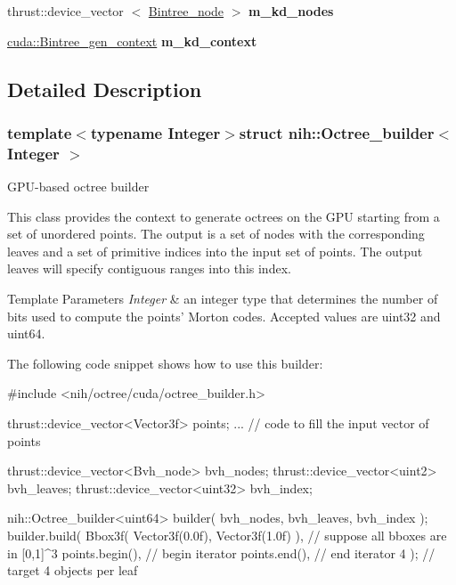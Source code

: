 \begin{DoxyCompactItemize}
\item 
\hypertarget{structnih_1_1_octree__builder_a3ef8a279ed45271b0bef0530932ae4c8}{
thrust\-::device\-\_\-vector\*
$<$ \hyperlink{structnih_1_1_bintree__node}{\-Bintree\-\_\-node} $>$ {\bfseries m\-\_\-kd\-\_\-nodes}}
\label{structnih_1_1_octree__builder_a3ef8a279ed45271b0bef0530932ae4c8}

\item 
\hypertarget{structnih_1_1_octree__builder_ac19a42cbf82d21e270512c0121c329c8}{
\hyperlink{structnih_1_1cuda_1_1_bintree__gen__context}{cuda\-::\-Bintree\-\_\-gen\-\_\-context} {\bfseries m\-\_\-kd\-\_\-context}}
\label{structnih_1_1_octree__builder_ac19a42cbf82d21e270512c0121c329c8}

\end{DoxyCompactItemize}


\subsection{\-Detailed \-Description}
\subsubsection*{template$<$typename Integer$>$struct nih\-::\-Octree\-\_\-builder$<$ Integer $>$}

\-G\-P\-U-\/based octree builder

\-This class provides the context to generate octrees on the \-G\-P\-U starting from a set of unordered points. \-The output is a set of nodes with the corresponding leaves and a set of primitive indices into the input set of points. \-The output leaves will specify contiguous ranges into this index.


\begin{DoxyTemplParams}{\-Template Parameters}
{\em \-Integer} & an integer type that determines the number of bits used to compute the points' \-Morton codes. \-Accepted values are uint32 and uint64.\\
\hline
\end{DoxyTemplParams}
\-The following code snippet shows how to use this builder\-:


\begin{DoxyCode}
 #include <nih/octree/cuda/octree_builder.h>

 thrust::device_vector<Vector3f> points;
 ... // code to fill the input vector of points

 thrust::device_vector<Bvh_node> bvh_nodes;
 thrust::device_vector<uint2>    bvh_leaves;
 thrust::device_vector<uint32>   bvh_index;

 nih::Octree_builder<uint64> builder( bvh_nodes, bvh_leaves, bvh_index );
 builder.build(
     Bbox3f( Vector3f(0.0f), Vector3f(1.0f) ),   // suppose all bboxes are in
       [0,1]^3
     points.begin(),                             // begin iterator
     points.end(),                               // end iterator
     4 );                                        // target 4 objects per leaf
\end{DoxyCode}
 

